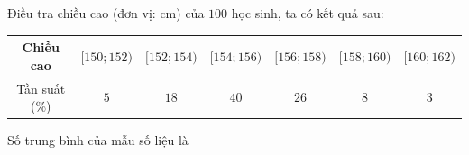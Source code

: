 \begin{ex}
Điều tra chiều cao (đơn vị: cm) của $100$ học sinh, ta có kết quả sau:
\begin{center}
\begin{tabular}{|c|c|c|c|c|c|c|}\hline
Chiều cao & $[150;152)$ & $[152;154)$ & $[154;156)$ & $[156;158)$ & $[158;160)$ & $[160;162)$\\\hline
Tần suất (\%) & $5$ & $18$ & $40$ & $26$ & $8$ & $3$\\\hline
\end{tabular}
\end{center}
Số trung bình của mẫu số liệu là
\end{ex}

